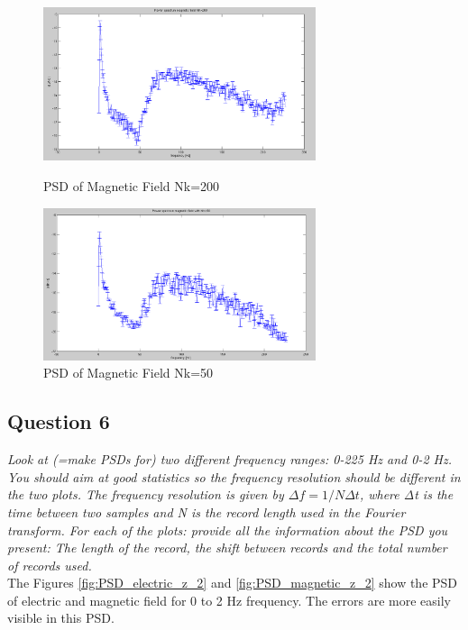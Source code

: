 \documentclass{article}
\begin{document}
\begin{figure}[htb!]
\begin{minipage}[c]{0.5\linewidth}
\centering
\includegraphics[width=8cm]{Figures/PSD_magnetic_200.png}
\caption{PSD of Magnetic Field Nk=200}
\label{fig:PSD_magnetic_200}
\end{minipage}
\hspace{0.1cm}
\begin{minipage}[c]{0.5\linewidth}
\centering
\includegraphics[width=8cm]{Figures/PSD_magnetic_50.png}
\caption{PSD of Magnetic Field Nk=50}
\label{fig:PSD_magnetic_50}
\end{minipage}
\end{figure}



\subsection{Question 6}
\textit{Look at (=make PSDs for) two different frequency ranges: 0-225 Hz and 0-2 Hz. You should aim at good statistics so the frequency resolution should be different in the two plots. The frequency resolution is given by $Δf=1/NΔt$, where Δt is the time between two samples and N is the record length used in the Fourier transform. For each of the plots: provide all the information about the PSD you present: The length of the record, the shift between records and the total number of records used.}\\

The Figures \ref{fig:PSD_electric_z_2} and \ref{fig:PSD_magnetic_z_2} show the PSD of electric and magnetic field for 0 to 2 Hz frequency. The errors are more easily visible in this PSD.
\end{document}
